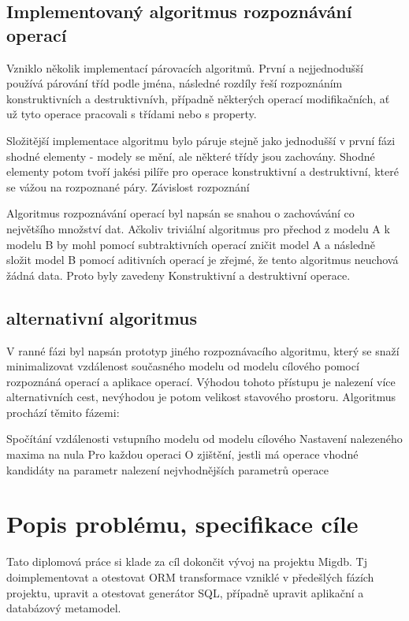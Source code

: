 \documentclass[11pt,twoside,a4paper]{book}
\begin{document}
 
 \section{Implementovaný algoritmus rozpoznávání operací}
 
 Vzniklo několik implementací párovacích algoritmů. První a nejjednodušší
 používá párování tříd podle jména, následné rozdíly řeší rozpoznáním
 konstruktivních a destruktivnívh, případně některých operací modifikačních, ať
 už tyto operace pracovali s třídami nebo s property.
 
 Složitější implementace algoritmu bylo páruje stejně jako jednodušší v
 první fázi shodné elementy - modely se mění, ale některé třídy jsou zachovány.
Shodné elementy potom tvoří jakési pilíře pro operace konstruktivní a
destruktivní, které se vážou na rozpoznané páry. Závislost rozpoznání

Algoritmus rozpoznávání operací byl napsán se snahou o zachovávání co největšího
množství dat. Ačkoliv triviální algoritmus pro přechod z modelu A k modelu B by
mohl pomocí subtraktivních operací zničit model A a následně složit model B
pomocí aditivních operací je zřejmé, že tento algoritmus neuchová žádná data.
Proto byly zavedeny Konstruktivní a destruktivní operace. 

\section{alternativní algoritmus}

V ranné fázi byl napsán prototyp jiného rozpoznávacího algoritmu, který se snaží 
minimalizovat vzdálenost současného modelu od modelu cílového pomocí rozpoznáná 
operací a aplikace operací. Výhodou tohoto přístupu je nalezení více alternativních 
cest, nevýhodou je potom velikost stavového prostoru. Algoritmus prochází těmito fázemi:

Spočítání vzdálenosti vstupního modelu od modelu cílového
Nastavení nalezeného maxima na nula
Pro každou operaci O
     zjištění, jestli má operace vhodné kandidáty na parametr
     nalezení nejvhodnějších parametrů operace



\chapter{Popis problému, specifikace cíle}
Tato diplomová práce si klade za cíl dokončit vývoj na projektu Migdb. Tj
doimplementovat a otestovat ORM transformace vzniklé v předešlých fázích
projektu, upravit a otestovat generátor SQL, případně upravit aplikační a
databázový metamodel.
\end{document}
